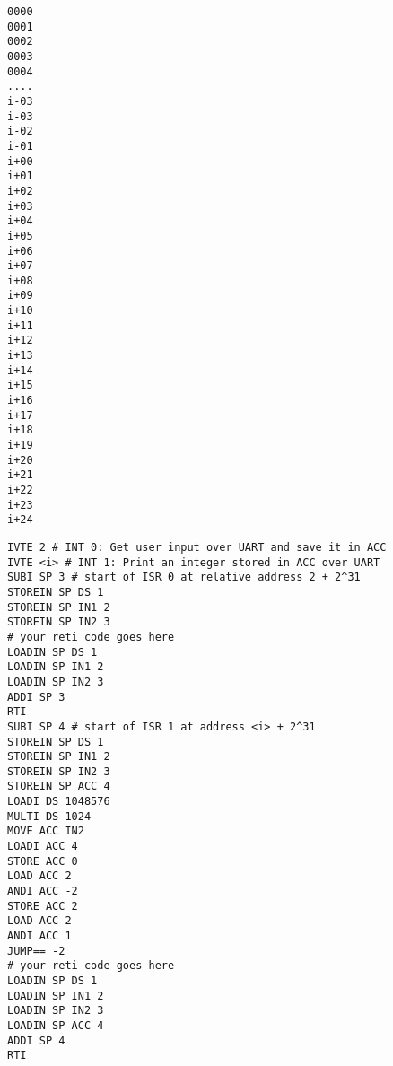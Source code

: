 \documentclass{article}
\newenvironment{adjustedminipage}[1]
{\vspace{0.1cm}\begin{minipage}[t]{#1}}
  {\end{minipage}\vspace{0.1cm}}
\begin{document}
\begin{adjustedminipage}{0.1\textwidth}
\begin{verbatim}
0000 
0001 
0002 
0003 
0004 
.... 
i-03 
i-03 
i-02 
i-01 
i+00 
i+01 
i+02 
i+03 
i+04 
i+05 
i+06 
i+07 
i+08 
i+09 
i+10 
i+11 
i+12 
i+13 
i+14 
i+15 
i+16 
i+17 
i+18 
i+19 
i+20 
i+21 
i+22 
i+23 
i+24 
\end{verbatim}
\end{adjustedminipage}
\begin{adjustedminipage}{0.8\textwidth}
\begin{verbatim}
IVTE 2 # INT 0: Get user input over UART and save it in ACC
IVTE <i> # INT 1: Print an integer stored in ACC over UART 
SUBI SP 3 # start of ISR 0 at relative address 2 + 2^31    
STOREIN SP DS 1                                            
STOREIN SP IN1 2                                           
STOREIN SP IN2 3                                           
# your reti code goes here                                 
LOADIN SP DS 1                                             
LOADIN SP IN1 2                                            
LOADIN SP IN2 3                                            
ADDI SP 3                                                  
RTI                                                        
SUBI SP 4 # start of ISR 1 at address <i> + 2^31           
STOREIN SP DS 1                                            
STOREIN SP IN1 2                                           
STOREIN SP IN2 3                                           
STOREIN SP ACC 4                                           
LOADI DS 1048576                                           
MULTI DS 1024                                              
MOVE ACC IN2                                               
LOADI ACC 4                                                
STORE ACC 0                                                
LOAD ACC 2                                                 
ANDI ACC -2                                                
STORE ACC 2                                                
LOAD ACC 2                                                 
ANDI ACC 1                                                 
JUMP== -2                                                  
# your reti code goes here                                      
LOADIN SP DS 1                                             
LOADIN SP IN1 2                                            
LOADIN SP IN2 3                                            
LOADIN SP ACC 4                                            
ADDI SP 4                                                  
RTI                                                        
\end{verbatim}
\end{adjustedminipage}
\end{document}
